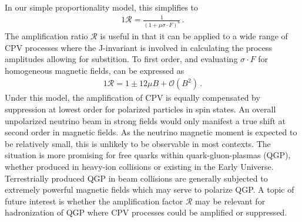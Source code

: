 In our simple proportionality model, this simplifies to
\begin{alignat}{1}
	\label{amp:2} \mathcal{R} = \frac{1}{\left(1+\mu\sigma\cdot F\right)^{6}}\,.
\end{alignat}
The amplification ratio $\mathcal{R}$ is useful in that it can be applied to a wide range of CPV processes where the J-invariant is involved in calculating the process amplitudes allowing for substition. To first order, and evaluating $\sigma\cdot F$ for homogeneous magnetic fields,  can be expressed as
\begin{alignat}{1}
	\label{amp:3} \mathcal{R} = 1\pm12\mu B+\mathcal{O}(B^{2})\,.
\end{alignat}
Under this model, the amplification of CPV is equally compensated by suppression at lowest order for polarized particles in spin states. An overall unpolarized neutrino beam in strong fields would only manifest a true shift at second order in magnetic fields. As the neutrino magnetic moment is expected to be relatively small, this is unlikely to be observable in most contexts. The situation is more promising for free quarks within quark-gluon-plasmas (QGP), whether produced in heavy-ion collisions or existing in the Early Universe. Terrestrially produced QGP in beam collisions are generally subjected to extremely powerful magnetic fields which may serve to polarize QGP. \ar A topic of future interest is whether the amplification factor $\mathcal{R}$ may be relevant for hadronization of QGP where CPV processes could be amplified or suppressed.